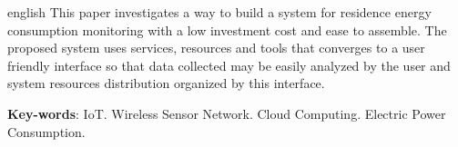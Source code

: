 \begin{resumo}[Abstract]
 \begin{otherlanguage*}{english}
   This paper investigates a way to build a system for residence energy consumption monitoring with a low investment cost and ease to assemble. The proposed system uses services, resources and tools that converges to a user friendly interface so that data collected may be easily analyzed by the user and system resources distribution organized by this interface.

   \vspace{\onelineskip}
 
   \noindent 
   \textbf{Key-words}: IoT. Wireless Sensor Network. Cloud Computing. Electric Power Consumption.
 \end{otherlanguage*}
\end{resumo}
